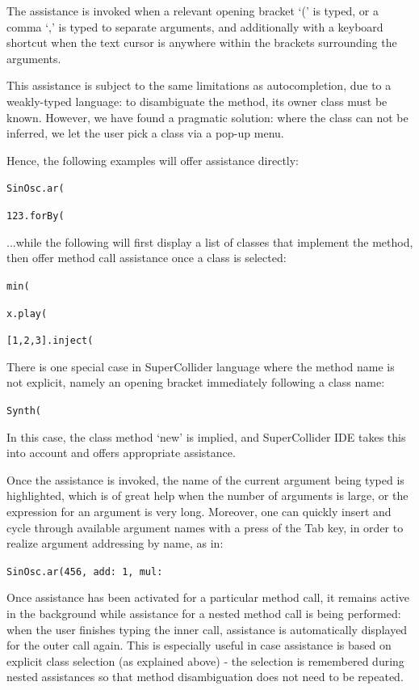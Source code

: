 \documentclass[11pt,a4paper]{article}
\begin{document}
The assistance is invoked when a relevant opening bracket `(' is typed, or a comma `,' is typed to
separate arguments, and additionally with a keyboard shortcut when the text cursor is anywhere
within the brackets surrounding the arguments.

This assistance is subject to the same limitations as autocompletion, due to a weakly-typed
language: to disambiguate the method, its owner class must be known. However, we have found a
pragmatic solution: where the class can not be inferred, we let the user pick a class via a pop-up
menu.

Hence, the following examples will offer assistance directly:

\verb|SinOsc.ar(|

\verb|123.forBy(|

...while the following will first display a list of classes that implement the method, then offer
method call assistance once a class is selected:

\verb|min(|

\verb|x.play(|

\verb|[1,2,3].inject(|

There is one special case in SuperCollider language where the method name is not explicit, namely
an opening bracket immediately following a class name:

\verb|Synth(|

In this case, the class method `new' is implied, and SuperCollider IDE takes this into account and
offers appropriate assistance.

Once the assistance is invoked, the name of the current argument being typed is highlighted, which
is of great help when the number of arguments is large, or the expression for an argument is very
long. Moreover, one can quickly insert and cycle through available argument names with a press of the Tab
key, in order to realize argument addressing by name, as in:

\verb|SinOsc.ar(456, add: 1, mul:|

Once assistance has been activated for a particular method call, it remains active in the background while assistance
for a nested method call is being performed: when the user finishes typing the inner call, assistance is automatically
displayed for the outer call again. This is especially useful in case assistance is based on explicit class selection
(as explained above) - the selection is remembered during nested assistances so that method disambiguation does not need
to be repeated.
\end{document}
